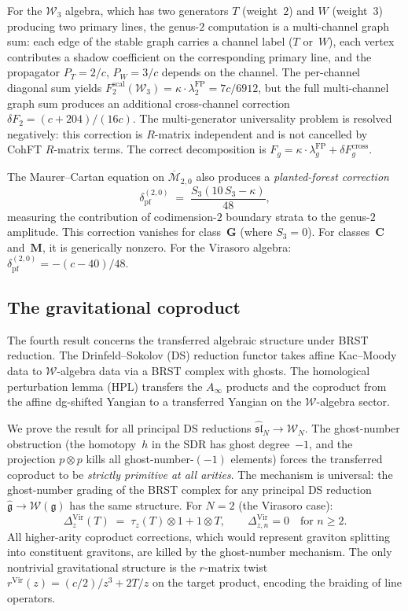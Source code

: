 \documentclass[11pt,reqno]{amsart}
\theoremstyle{definition}
\theoremstyle{remark}
\newcommand{\cM}{\mathcal{M}}
\newcommand{\fg}{\mathfrak{g}}
\newcommand{\Vir}{\mathrm{Vir}}
\newcommand{\cW}{\mathcal{W}}
\numberwithin{equation}{section}
\begin{document}
For the $\mathcal{W}_3$ algebra, which has two generators
$T$ (weight~$2$) and $W$ (weight~$3$) producing two primary
lines, the genus-$2$ computation is a multi-channel graph sum:
each edge of the stable graph carries a channel label
($T$ or~$W$), each vertex contributes a shadow coefficient on
the corresponding primary line, and the propagator
$P_T = 2/c$, $P_W = 3/c$ depends on the channel. The
per-channel diagonal sum yields
$F_2^{\mathrm{scal}}(\mathcal{W}_3) = \kappa \cdot \lambda_2^{\mathrm{FP}}
= 7c/6912$, but the full multi-channel graph sum produces an
additional cross-channel correction
$\delta F_2 = (c+204)/(16c)$. The multi-generator universality
problem is resolved negatively: this correction is $R$-matrix
independent and is not cancelled by CohFT $R$-matrix terms.
The correct decomposition is
$F_g = \kappa \cdot \lambda_g^{\mathrm{FP}} +
\delta F_g^{\mathrm{cross}}$.

The Maurer--Cartan equation on
$\overline{\cM}_{2,0}$ also produces a
\emph{planted-forest correction}
\begin{equation}\label{eq:intro-planted-forest}
 \delta_{\mathrm{pf}}^{(2,0)}
 \;=\;
 \frac{S_3(10\,S_3 - \kappa)}{48},
\end{equation}
measuring the contribution of codimension-$2$ boundary strata
to the genus-$2$ amplitude. This correction vanishes for
class~$\mathbf{G}$ (where $S_3 = 0$). For
classes~$\mathbf{C}$ and~$\mathbf{M}$, it is generically nonzero.
For the Virasoro algebra:
$\delta_{\mathrm{pf}}^{(2,0)} = -(c - 40)/48$.

\subsection{The gravitational coproduct}

The fourth result concerns the transferred algebraic structure
under BRST reduction. The Drinfeld--Sokolov (DS) reduction
functor takes affine Kac--Moody data to $\cW$-algebra data via a
BRST complex with ghosts. The homological perturbation lemma
(HPL) transfers the $A_\infty$ products and the coproduct from
the affine dg-shifted Yangian to a transferred Yangian on the
$\cW$-algebra sector.

We prove the result for all principal DS reductions
$\widehat{\mathfrak{sl}}_N \to \cW_N$.
The ghost-number obstruction (the homotopy~$h$ in the SDR has
ghost degree~$-1$, and the projection $p \otimes p$ kills all
ghost-number-$(-1)$ elements) forces the transferred coproduct to
be \emph{strictly primitive at all arities}. The mechanism is
universal: the ghost-number grading of the BRST complex for any
principal DS reduction $\widehat{\fg} \to \cW(\fg)$ has the same
structure. For $N = 2$ (the Virasoro case):
\[
 \Delta_z^{\Vir}(T)
 \;=\;
 \tau_z(T) \otimes 1 + 1 \otimes T,
 \qquad
 \Delta_{z,n}^{\Vir} = 0
 \quad\text{for } n \ge 2.
\]
All higher-arity coproduct corrections, which would represent
graviton splitting into constituent gravitons, are killed by the
ghost-number mechanism. The only nontrivial gravitational
structure is the $r$-matrix twist
$r^{\Vir}(z) = (c/2)/z^3 + 2T/z$ on the target product,
encoding the braiding of line operators.
\end{document}
